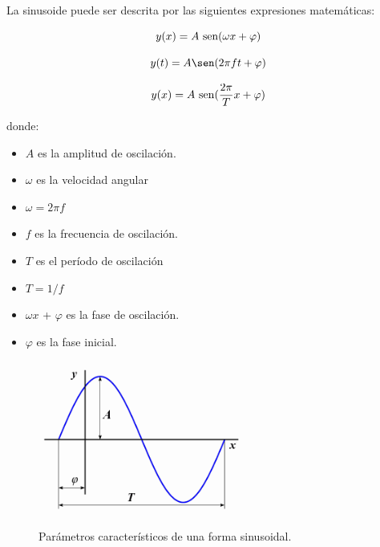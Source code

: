 \documentclass[]{article}
\begin{document}
La sinusoide puede ser descrita por las siguientes expresiones matemáticas:

\begin{equation}
y(x) = A\ {\rm{sen}} (\omega x + \varphi)
\end{equation}

\begin{equation}
y(t) = A\sen(2 \pi f t + \varphi)
\end{equation}

\begin{equation}
y(x) = A\ {\rm{sen}}  (\frac {2\pi }{T}x + \varphi )
\end{equation}

donde:\\

\begin{itemize}
	\item $A$ es la amplitud de oscilación.
	\item $\omega$ es la velocidad angular  \item $\omega = 2\pi f$
	\item $f$ es la frecuencia de oscilación.
	\item $T$ es el período de oscilación  \item  $T = {1}/{f}$
	\item $\omega x$ + $\varphi$ es la fase de oscilación.
	\item $\varphi$ es la fase inicial.
\end{itemize}

\begin{figure}[h!]
	\centering
	\includegraphics[width=0.6\textwidth]{Imagenes/Alg_sinusoide.png}
	\caption{Parámetros característicos de una forma sinusoidal.}
	\label{fig:parametro_sinusoide}
\end{figure}
\end{document}
